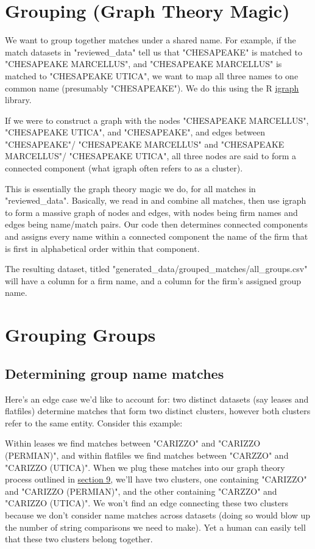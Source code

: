 \documentclass{article}
\begin{document}
\section{Grouping (Graph Theory Magic)}
\label{sec:graph-theory}

We want to group together matches under a shared name. For example, if the match datasets in "reviewed\_data" tell us that "CHESAPEAKE" is matched to "CHESAPEAKE MARCELLUS", and "CHESAPEAKE MARCELLUS" is matched to "CHESAPEAKE UTICA", we want to map all three names to one common name (presumably "CHESAPEAKE"). We do this using the R \href{https://cran.r-project.org/web/packages/igraph/igraph.pdf}{igraph} library. 

If we were to construct a graph with the nodes "CHESAPEAKE MARCELLUS", "CHESAPEAKE UTICA", and "CHESAPEAKE", and edges between "CHESAPEAKE"/ "CHESAPEAKE MARCELLUS" and "CHESAPEAKE MARCELLUS"/ "CHESAPEAKE UTICA", all three nodes are said to form a connected component (what igraph often refers to as a cluster). 

This is essentially the graph theory magic we do, for all matches in "reviewed\_data". Basically, we read in and combine all matches, then use igraph to form a massive graph of nodes and edges, with nodes being firm names and edges being name/match pairs. Our code then determines connected components and assigns every name within a connected component the name of the firm that is first in alphabetical order within that component. 

The resulting dataset, titled "generated\_data/grouped\_matches/all\_groups.csv" will have a column for a firm name, and a column for the firm's assigned group name. 

\section{Grouping Groups}

\subsection{Determining group name matches}

Here's an edge case we'd like to account for: two distinct datasets (say leases and flatfiles) determine matches that form two distinct clusters, however both clusters refer to the same entity. Consider this example:

Within leases we find matches between "CARIZZO" and "CARIZZO (PERMIAN)", and within flatfiles we find matches between "CARZZO" and "CARIZZO (UTICA)". When we plug these matches into our graph theory process outlined in  \hyperref[sec:graph-theory]{section 9}, we'll have two clusters, one containing "CARIZZO" and "CARIZZO (PERMIAN)", and the other containing "CARZZO" and "CARIZZO (UTICA)". We won't find an edge connecting these two clusters because we don't consider name matches across datasets (doing so would blow up the number of string comparisons we need to make). Yet a human can easily tell that these two clusters belong together.
\end{document}
